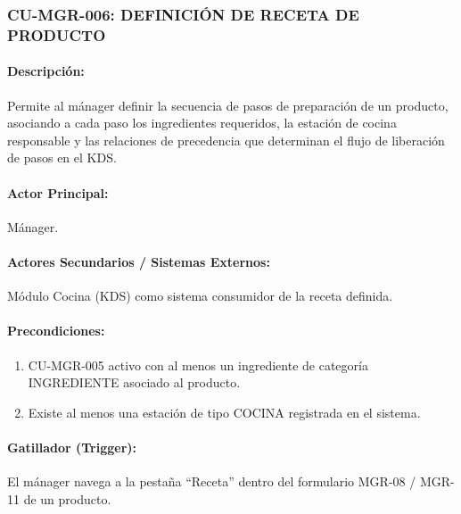 \subsubsection{CU-MGR-006: DEFINICIÓN DE RECETA DE PRODUCTO}
\paragraph{Descripción:} Permite al mánager definir la secuencia de pasos de preparación de un producto, asociando a cada paso los ingredientes requeridos, la estación de cocina responsable y las relaciones de precedencia que determinan el flujo de liberación de pasos en el KDS.

\paragraph{Actor Principal:} Mánager.

\paragraph{Actores Secundarios / Sistemas Externos:} Módulo Cocina (KDS) como sistema consumidor de la receta definida.

\paragraph{Precondiciones:}
\begin{enumerate}
    \item[I.] CU-MGR-005 activo con al menos un ingrediente de categoría INGREDIENTE asociado al producto.
    \item[II.] Existe al menos una estación de tipo COCINA registrada en el sistema.
\end{enumerate}

\paragraph{Gatillador (Trigger):} El mánager navega a la pestaña ``Receta'' dentro del formulario MGR-08 / MGR-11 de un producto.

